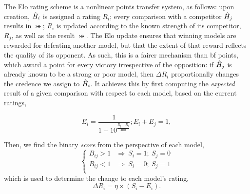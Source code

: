 The Elo rating scheme is a nonlinear points transfer system, as follows: 
    upon creation, $\hat{H}_i$ is assigned a rating $R_i$; 
    every comparison with a competitor $\hat{H}_j$ results in $\bij$; 
    $R_i$ is updated according to the known strength of its competitor, $R_j$, 
    as well as the result $\bij$. 
The Elo update ensures that winning models are rewarded 
    for defeating another model, 
    but that the extent of that reward reflects the quality of its opponent. 
As such, this is a fairer mechanism than \gls{bf} points, 
    which award a point for every victory irrespective of the opposition:
    if $\hat{H}_j$ is already known to be a strong or poor model, 
    then $\Delta R_i$ proportionally changes the credence we assign to $\hat{H}_i$. 
It achieves this by first computing the \emph{expected} result of a given comparison
    with respect to each model, based on the current ratings, 

\begin{subequations}
    \label{eqn:elo_expected_score}
    \begin{equation}
        E_i 
        = \frac{1}{1 + 10^{\frac{R_j - R_i}{400}}} ;
    \end{equation}
    \begin{equation}
        E_i + E_j = 1,
    \end{equation}    
\end{subequations}

Then, we find the binary \emph{score} from the perspective of each model,
\begin{equation}
    \label{eqn:elo_score}
    \begin{cases}
        B_{ij} > 1 & \Rightarrow \ S_i = 1; \ S_j =0  \\
        B_{ij} < 1 & \Rightarrow \ S_i = 0; \ S_j = 1 \\
    \end{cases}
\end{equation}
which is used to determine the change to each model's rating,
\begin{equation}
    \label{eqn:elo_delta_r}
    \Delta R_i = \eta \times \left( S_i - E_i \right).
\end{equation}

